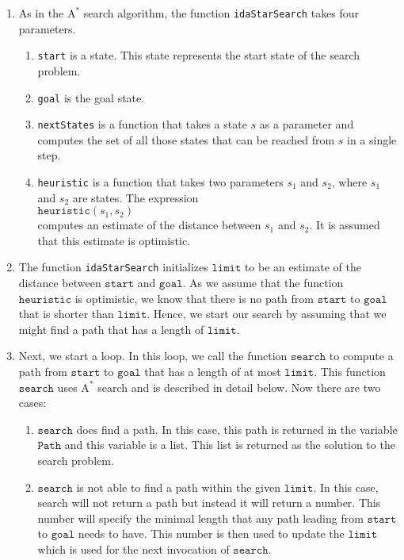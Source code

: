 \begin{enumerate}
\item As in the $\mathrm{A}^*$ search algorithm, the function \texttt{idaStarSearch} takes four parameters.
      \begin{enumerate}
      \item \texttt{start} is a state.  This state represents the start state of the search problem.
      \item \texttt{goal} is the goal state.  
      \item \texttt{nextStates} is a function that takes a state $s$ as a parameter and 
            computes the set of all those states that can be reached from $s$ in a single step.
      \item \texttt{heuristic} is a function that takes two parameters $s_1$ and $s_2$, where $s_1$ and $s_2$
            are states. The expression
            \\[0.2cm]
            \hspace*{1.3cm}
            $\texttt{heuristic}(s_1, s_2)$ 
            \\[0.2cm]
            computes an estimate of the distance between $s_1$ and $s_2$.  It is assumed that this
            estimate is optimistic.  
     \end{enumerate}
\item The function \texttt{idaStarSearch} initializes $\mathtt{limit}$ to be an estimate of the distance
      between $\mathtt{start}$ and $\mathtt{goal}$.  As we assume that the function $\mathtt{heuristic}$ is
      optimistic, we know that there is no path from $\mathtt{start}$ to $\mathtt{goal}$ that is shorter than
      $\mathtt{limit}$.  Hence, we start our search by assuming that we might find a path that has a length of 
      $\mathtt{limit}$.
\item Next, we start a loop.  In this loop, we call the function $\mathtt{search}$ to compute a path from
      $\mathtt{start}$ to $\mathtt{goal}$ that has a length of at most $\mathtt{limit}$.  This function
      $\mathtt{search}$ uses $\mathrm{A}^*$ search and is described in detail below.
      Now there are two cases:
      \begin{enumerate}
      \item $\mathtt{search}$ does find a path.  In this case, this path is returned in the variable
            $\mathtt{Path}$ and this variable is a list.  This list is returned as the solution to the search
            problem.
      \item $\mathtt{search}$ is not able to find a path within the given $\mathtt{limit}$.  In this case,
            $\mathrm{search}$ will not return a path but instead it will return a number.  This number will
            specify the minimal length that any path leading from $\mathtt{start}$ to $\mathtt{goal}$ needs to
            have.  This number is then used to update the $\mathtt{limit}$ which is used for the next
            invocation of $\mathtt{search}$.


\end{enumerate}
\end{enumerate}
